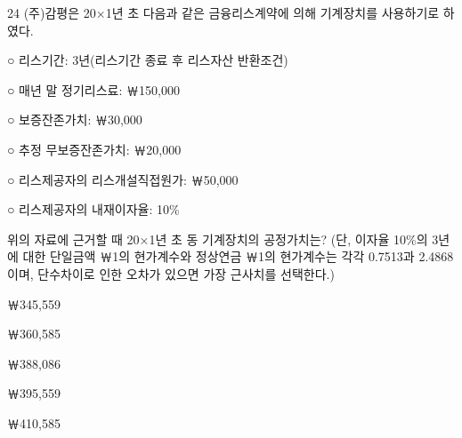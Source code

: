 \begin{question}{24}
(주)감평은 20×1년 초 다음과 같은 금융리스계약에 의해 기계장치를 사용하기로 하였다.
\begin{framedtext}
○ 리스기간: 3년(리스기간 종료 후 리스자산 반환조건) \par
○ 매년 말 정기리스료: ￦150,000 \par
○ 보증잔존가치: ￦30,000 \par
○ 추정 무보증잔존가치: ￦20,000 \par
○ 리스제공자의 리스개설직접원가: ￦50,000 \par
○ 리스제공자의 내재이자율: 10\% \par
\end{framedtext}
위의 자료에 근거할 때 20×1년 초 동 기계장치의 공정가치는? (단, 이자율 10\%의 3년에 대한 단일금액 ￦1의 현가계수와 정상연금 ￦1의 현가계수는 각각 0.7513과 2.4868이며, 단수차이로 인한 오차가 있으면 가장 근사치를 선택한다.) \par
\begin{choices}
  \item ￦345,559
  \item ￦360,585
  \item ￦388,086
  \item ￦395,559
  \item ￦410,585
\end{choices}
\end{question}
